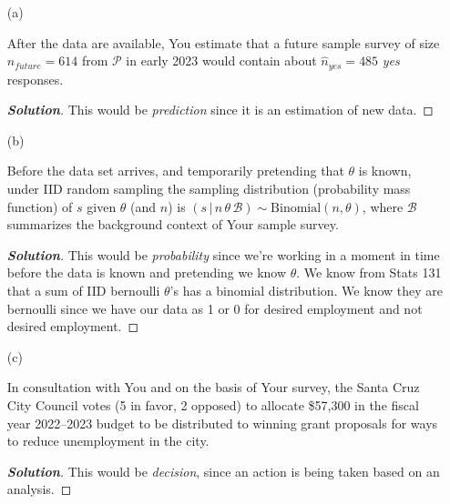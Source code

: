 \documentclass[12pt]{article}
\newenvironment{solution}{\begin{proof}[\textbf{\textit{Solution}}] }{\end{proof}}
\newcommand{\given}{\, | \,}
\begin{document}
\begin{itemize}
\begin{itemize}
\item[(a)]

After the data are available, You estimate that a future sample survey of size $n_{ future } = 614$ from $\mathcal{ P }$ in early 2023 would contain about $\hat{ n }_{ yes } = 485$ \textit{yes} responses.

\begin{tcolorbox}
    \begin{solution}
        This would be \textit{prediction} since it is an estimation of new data. 
    \end{solution}
\end{tcolorbox}

\vspace*{0.6in}

\item[(b)]

Before the data set arrives, and temporarily pretending that $\theta$ is known, under IID random sampling the sampling distribution (probability mass function) of $s$ given $\theta$ (and $n$) is $( s \given n \, \theta \, \mathcal{ B } ) \sim \textrm{Binomial} ( n, \theta )$, where $\mathcal{ B }$ summarizes the background context of Your sample survey.

\begin{tcolorbox}
    \begin{solution}
        This would be \textit{probability} since we're working in a moment in time before the data is known and pretending we know $\theta$. We know from Stats 131 that a sum of IID bernoulli $\theta$'s has a binomial distribution. We know they are bernoulli since we have our data as 1 or 0 for desired employment and not desired employment.  
    \end{solution}
\end{tcolorbox}

\vspace*{0.6in}

\item[(c)]

In consultation with You and on the basis of Your survey, the Santa Cruz City Council votes (5 in favor, 2 opposed) to allocate \$57,300 in the fiscal year 2022--2023 budget to be distributed to winning grant proposals for ways to reduce unemployment in the city.

\begin{tcolorbox}
    \begin{solution}
        This would be \textit{decision}, since an action is being taken based on an analysis. 
    \end{solution}
\end{tcolorbox}


\end{itemize}
\end{itemize}
\end{document}
